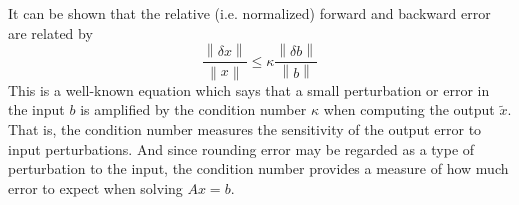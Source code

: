 \documentclass[onefignum,onetabnum]{siamart190516}
\begin{document}
It can be shown that the relative (i.e. normalized) forward and backward error are related by
\cite{Trefethen97}
\begin{equation}
\frac{\left\lVert \delta x \right\rVert}{\left\lVert x \right\rVert}
\leq \kappa
\frac{\left\lVert \delta b \right\rVert}{\left\lVert b \right\rVert}
\label{condnothm}
\end{equation}
This is a well-known equation which says that a small perturbation or error in the input $b$ 
is amplified by the condition number $\kappa$ when computing the output $\tilde{x}$.
That is, the condition number measures the sensitivity of the output error to input perturbations.
And since rounding error may be regarded as a type of perturbation to the input, the
condition number provides a measure of how much error to expect when solving $A x = b$.
\end{document}
